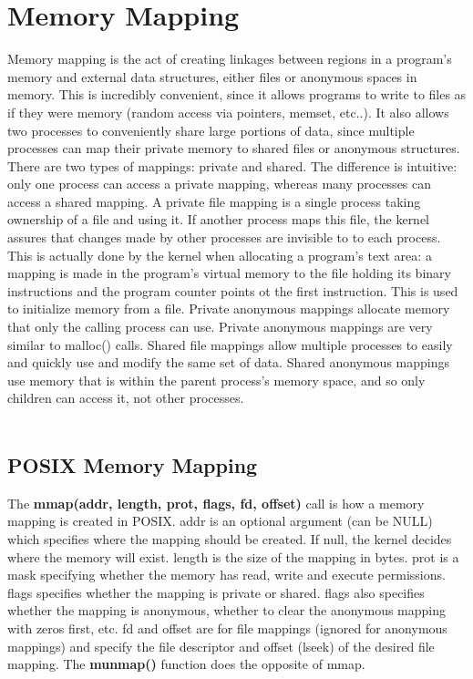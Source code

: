 \documentclass[11pt]{article}
\begin{document}
\section{Memory Mapping}
Memory mapping is the act of creating linkages between regions in a program's memory and external data structures, either files or anonymous spaces in memory. This is incredibly convenient, since it allows programs to write to files as if they were memory (random access via pointers, memset, etc..). It also allows two processes to conveniently share large portions of data, since multiple processes can map their private memory to shared files or anonymous structures. There are two types of mappings: private and shared. The difference is intuitive: only one process can access a private mapping, whereas many processes can access a shared mapping. A private file mapping is a single process taking ownership of a file and using it. If another process maps this file, the kernel assures that changes made by other processes are invisible to to each process. This is actually done by the kernel when allocating a program's text area: a mapping is made in the program's virtual memory to the file holding its binary instructions and the program counter points ot the first instruction. This is used to initialize memory from a file. Private anonymous mappings allocate memory that only the calling process can use. Private anonymous mappings are very similar to malloc() calls. Shared file mappings allow multiple processes to easily and quickly use and modify the same set of data. Shared anonymous mappings use memory that is within the parent process's memory space, and so only children can access it, not other processes.\\ \\

\subsection{POSIX Memory Mapping}
The \textbf{mmap(addr, length, prot, flags, fd, offset)} call is how a memory mapping is created in POSIX. addr is an optional argument (can be NULL) which specifies where the mapping should be created. If null, the kernel decides where the memory will exist. length is the size of the mapping in bytes. prot is a mask specifying whether the memory has read, write and execute permissions. flags specifies whether the mapping is private or shared. flags also specifies whether the mapping is anonymous, whether to clear the anonymous mapping with zeros first, etc. fd and offset are for file mappings (ignored for anonymous mappings) and specify the file descriptor and offset (lseek) of the desired file mapping. The \textbf{munmap()} function does the opposite of mmap.\\ \\
\end{document}
